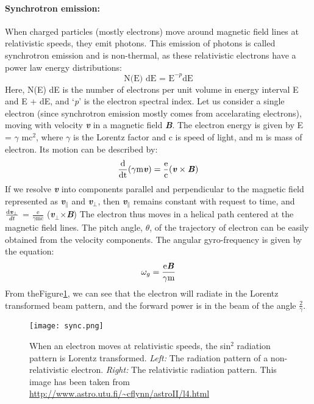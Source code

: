 \documentclass[../main/thesis_msc.tex]{subfiles}
\begin{document}
\paragraph{Synchrotron emission:}
\label{sec:sync}
When charged particles (mostly electrons) move around magnetic field lines at relativistic speeds, they emit photons. This emission of photons is called synchrotron emission and is non-thermal, as these relativistic electrons have a power law energy distributions:
\begin{equation}
\textrm{N(E) dE = E}^{-p} \textrm{dE}
\end{equation}
\noindent Here, N(E) dE is the number of electrons per unit volume in energy interval E and E + dE, and `\textit{p}' is the electron spectral index.
\noindent Let us consider a single electron (since synchrotron emission mostly comes from accelarating electrons), moving with velocity {\textbf{\textit{v}}} in a magnetic field {\textbf{\textit{B}}}. The electron energy is given by E = $\gamma$ mc$^2$, where $\gamma$ is the Lorentz factor and c is speed of light, and m is mass of electron. Its motion can be described by:
\begin{equation}
\frac{\textrm{d}}{\textrm{dt}} (\gamma \textrm{m}  {\textbf{\textit{v}}} ) = \frac{\textrm{e}}{\textrm{c}} (  {\textbf{\textit{v}}} \times  {\textbf{\textit{B}}} )
\end{equation}
\noindent If we resolve {\textbf{\textit{v}}} into components parallel and perpendicular to the magnetic field represented as  {\textbf{\textit{v$_{\|}$}}} and {\textbf{\textit{v$_{\bot}$}}}, then {\textbf{\textit{v$_{\|}$}}} remains constant with request to time, and $\frac{ \textrm{d{\textbf{\textit{v$_{\bot}$}}}}}{dt}$ = $\frac{\textrm{e}}{ \gamma \textrm{mc} }$ ({\textbf{\textit{v$_{\bot}$}}}$\times${\textbf{\textit{B}}})
\noindent The electron thus moves in a helical path centered at the magnetic field lines. The pitch angle, $\theta$, of the trajectory of electron can be easily obtained from the velocity components. The angular gyro-frequency is given by the equation:
\begin{equation}
\omega_g = \frac{\textrm{e}{\textbf{\textit{B}}}}{\gamma \textrm{m}}
\end{equation}
\noindent From theFigure\ref{sync}, we can see that the electron will radiate in the Lorentz transformed beam pattern, and the forward power is in the beam of the angle $\frac{2}{\gamma}$.  
\begin{figure}
\centering
\texttt{[image: sync.png]}
\caption{When an electron moves at relativistic speeds, the sin$^2$ radiation pattern is Lorentz transformed. \textit{Left:} The radiation pattern of a non-relativistic electron. \textit{Right:} The relativistic radiation pattern. This image has been taken from \url{http://www.astro.utu.fi/~cflynn/astroII/l4.html}}
\label{sync}
\end{figure}
\end{document}
